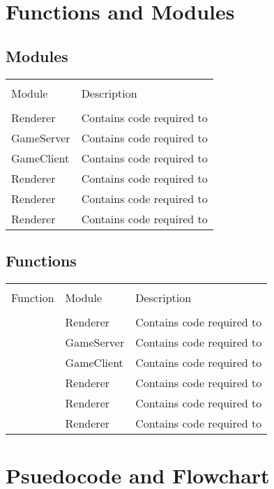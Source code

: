\documentclass[12pt, DIV=calc]{scrartcl}
\begin{document}
\section{Functions and Modules}
\subsection{Modules}
\begin{xltabular}[c]{\textwidth}{| X | X |}
    \hline \\
Module & Description \\
    \hline \hline \\
Renderer & Contains code required to  \\ \hline
GameServer & Contains code required to  \\ \hline
GameClient & Contains code required to  \\ \hline
Renderer & Contains code required to  \\ \hline
Renderer & Contains code required to  \\ \hline
Renderer & Contains code required to  \\ \hline
\end{xltabular}

\subsection{Functions}
\begin{xltabular}[c]{\textwidth}{| X | X | X |}
    \hline \\
Function & Module & Description \\
    \hline \hline \\
 & Renderer & Contains code required to  \\ \hline
 & GameServer & Contains code required to  \\ \hline
 & GameClient & Contains code required to  \\ \hline
 & Renderer & Contains code required to  \\ \hline
 & Renderer & Contains code required to  \\ \hline
 & Renderer & Contains code required to  \\ \hline
\end{xltabular}

\section{Psuedocode and Flowchart}
\end{document}
